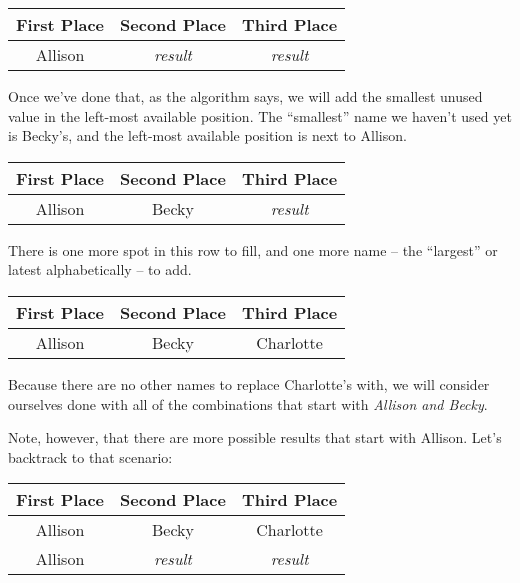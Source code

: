 \begin{center}
    \begin{tabulary}{\textwidth}{CCC}
        First Place & Second Place & Third Place\\
        \hline
        Allison & \textit{result} & \textit{result}
    \end{tabulary}
\end{center}

Once we've done that, as the algorithm says, we will add the smallest unused value in the left-most available position.  The ``smallest'' name we haven't used yet is Becky's, and the left-most available position is next to Allison.

\begin{center}
    \begin{tabulary}{\textwidth}{CCC}
        First Place & Second Place & Third Place\\
        \hline
        Allison & Becky & \textit{result}
    \end{tabulary}
\end{center}

There is one more spot in this row to fill, and one more name -- the ``largest'' or latest alphabetically -- to add.

\begin{center}
    \begin{tabulary}{\textwidth}{CCC}
        First Place & Second Place & Third Place\\
        \hline
        Allison & Becky & Charlotte
    \end{tabulary}
\end{center}

Because there are no other names to replace Charlotte's with, we will consider ourselves done with all of the combinations that start with \textit{Allison and Becky}.

Note, however, that there are more possible results that start with Allison.  Let's backtrack to that scenario:

\begin{center}
    \begin{tabulary}{\textwidth}{CCC}
        First Place & Second Place & Third Place\\
        \hline
        Allison & Becky & Charlotte\\
        Allison & \textit{result} & \textit{result}
    \end{tabulary}
\end{center}

